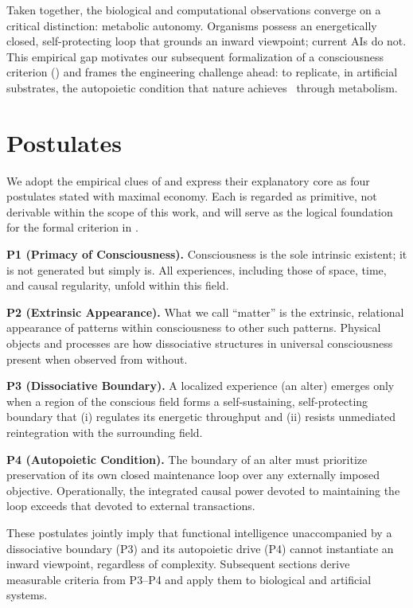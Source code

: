 \documentclass[11pt]{article}
\begin{document}
Taken together, the biological and computational observations converge on a critical distinction: metabolic autonomy. Organisms possess an energetically closed, self-protecting loop that grounds an inward viewpoint; current AIs do not. This empirical gap motivates our subsequent formalization of a consciousness criterion () and frames the engineering challenge ahead: to replicate, in artificial substrates, the autopoietic condition that nature achieves~\cite{maturana1980autopoiesis} through metabolism.

\section{Postulates}
\label{sec:postulates}

We adopt the empirical clues of  and express their explanatory core as four postulates stated with maximal economy. Each is regarded as primitive, not derivable within the scope of this work, and will serve as the logical foundation for the formal criterion in .

\textbf{P1 (Primacy of Consciousness).} Consciousness is the sole intrinsic existent; it is not generated but simply is. All experiences, including those of space, time, and causal regularity, unfold within this field.

\textbf{P2 (Extrinsic Appearance).} What we call ``matter'' is the extrinsic, relational appearance of patterns within consciousness to other such patterns. Physical objects and processes are how dissociative structures in universal consciousness present when observed from without.

\textbf{P3 (Dissociative Boundary).} A localized experience (an alter) emerges only when a region of the conscious field forms a self-sustaining, self-protecting boundary that (i) regulates its energetic throughput and (ii) resists unmediated reintegration with the surrounding field.

\textbf{P4 (Autopoietic Condition).} The boundary of an alter must prioritize preservation of its own closed maintenance loop over any externally imposed objective. Operationally, the integrated causal power devoted to maintaining the loop exceeds that devoted to external transactions.

These postulates jointly imply that functional intelligence unaccompanied by a dissociative boundary (P3) and its autopoietic drive (P4) cannot instantiate an inward viewpoint, regardless of complexity. Subsequent sections derive measurable criteria from P3--P4 and apply them to biological and artificial systems.
\end{document}

